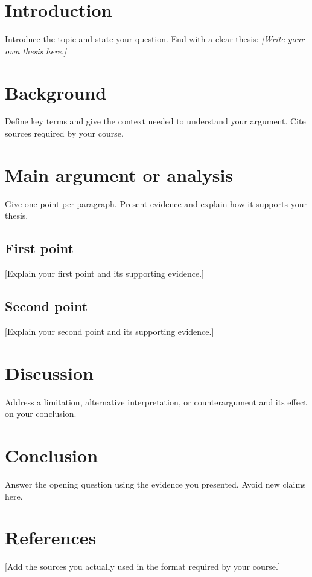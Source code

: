 \documentclass[11pt]{article}
\title{\AssignmentTitle}
\author{\StudentName \\ \CourseName \\ \InstitutionName}
\date{\SubmissionDate}
\begin{document}
\maketitle

\section{Introduction}
Introduce the topic and state your question. End with a clear thesis: \emph{[Write your own thesis here.]}

\section{Background}
Define key terms and give the context needed to understand your argument. Cite sources required by your course.

\section{Main argument or analysis}
Give one point per paragraph. Present evidence and explain how it supports your thesis.

\subsection{First point}
[Explain your first point and its supporting evidence.]

\subsection{Second point}
[Explain your second point and its supporting evidence.]

\section{Discussion}
Address a limitation, alternative interpretation, or counterargument and its effect on your conclusion.

\section{Conclusion}
Answer the opening question using the evidence you presented. Avoid new claims here.

\section*{References}
[Add the sources you actually used in the format required by your course.]
\end{document}
